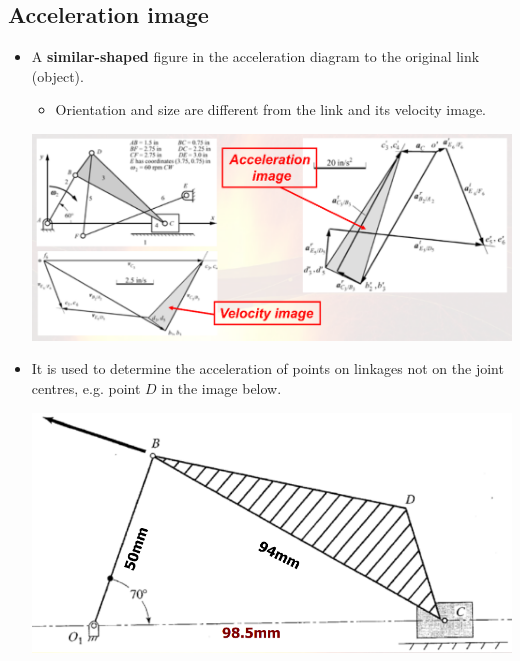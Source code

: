 \documentclass[11pt]{article}
\begin{document}
\subsection{Acceleration image}
\label{sec:org7b28f59}
\begin{itemize}
\item A \textbf{similar-shaped} figure in the acceleration diagram to the original link (object).
\begin{itemize}
\item Orientation and size are different from the link and its velocity image.
\end{itemize}
\begin{center}
\includegraphics[width=.9\linewidth]{./images/acceleration-image-comparison.png}
\end{center}
\item It is used to determine the acceleration of points on linkages not on the joint centres, e.g. point \(D\) in the image below.
\begin{center}
\includegraphics[width=.9\linewidth]{./images/velocity-image-diagram.png}
\end{center}
\end{itemize}

 \newpage
\end{document}
